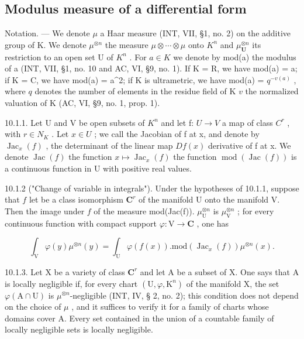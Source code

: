 \subsection{Modulus measure of a differential form}

Notation. --- We denote \(\mu\) a Haar measure (INT, VII, §1, no. 2) on the additive group of K. We denote \(\mu^{\otimes n}\) the measure \(\mu \otimes \cdots \otimes \mu\) onto \(K^n\) and \(\mu_{\mathbf{U}}^{\otimes n}\) its restriction to an open set U of \(K^n\) . For \(a \in K\) we denote by mod(a) the modulus of a (INT, VII, §1, no. 10 and AC, VI, §9, no. 1). If K = R, we have mod(a) = \textbar a\textbar; if K = C, we have mod(a) = \textbar a\textbar\^{}2; if K is ultrametric, we have mod(a) = \(q^{-v(a)}\) , where \(q\) denotes the number of elements in the residue field of K \(v\) the normalized valuation of K (AC, VI, §9, no. 1, prop. 1).

10.1.1. Let U and V be open subsets of \(K^{n}\) and let f: \(U \to V\) a map of class \(C^{r}\) , with \(r \in N_{K}\) . Let \(x \in U\) ; we call the Jacobian of f at x, and denote by \(\operatorname{Jac}_{x}(f)\) , the determinant of the linear map \(Df(x)\) derivative of f at x. We denote \(\operatorname{Jac}(f)\) the function \(x \mapsto \operatorname{Jac}_{x}(f)\) the function \(\operatorname{mod}(\operatorname{Jac}(f))\) is a continuous function in U with positive real values.

10.1.2 ("Change of variable in integrals"). Under the hypotheses of 10.1.1, suppose that \(f\) let be a class isomorphism \(\mathbf{C}^{r}\) of the manifold U onto the manifold V. Then the image under \(f\) of the measure mod(Jac(f)). \(\mu_{\mathrm{U}}^{\otimes n}\) is \(\mu_{\mathrm{V}}^{\otimes n}\) ; for every continuous function with compact support \(\varphi: \mathrm{V} \to \mathbf{C}\) , one has

\[
\int_ {\mathrm{V}} \varphi (y) \mu^ {\otimes n} (y) = \int_ {\mathrm{U}} \varphi (f (x)). \mathrm{mod} (\operatorname{Jac} _ {x} (f)) \mu^ {\otimes n} (x).\tag{1}
\]

10.1.3. Let X be a variety of class \(\mathbf{C}^r\) and let A be a subset of X. One says that A is locally negligible if, for every chart \((\mathrm{U},\varphi ,\mathrm{K}^n)\) of the manifold X, the set \(\varphi (\mathrm{A}\cap \mathrm{U})\) is \(\mu^{\otimes n}\)-negligible (INT, IV, § 2, no. 2); this condition does not depend on the choice of \(\mu\) , and it suffices to verify it for a family of charts whose domains cover A. Every set contained in the union of a countable family of locally negligible sets is locally negligible.

